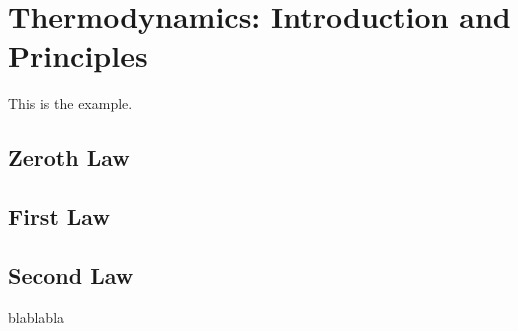 
\chapter{Thermodynamics: Introduction and Principles}
%

\begin{exmp}
This is the example.
\end{exmp}


\section{Zeroth Law}\label{zeroth_law}



\section{First Law}\label{first_law}


\section{Second Law}\label{second_law}





blablabla \cite{batchelor_1967} \cite{SmithVanNess_Book}

%
